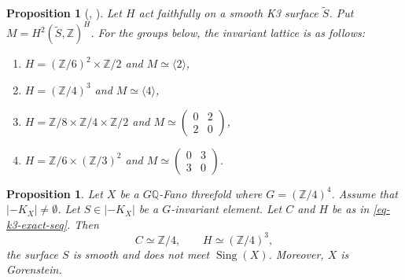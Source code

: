 \documentclass[10pt,oneside,reqno]{amsart}
\numberwithin{equation}{section}
\newtheorem{proposition}[theorem]{Proposition}
\theoremstyle{definition}
\newcommand{\Z}{\mathbb Z}
\newcommand{\Sing}{\operatorname{Sing}}
\begin{document}
\begin{proposition}[{\cite{BH}, \cite[Proposition~4.4]{LPZ}}]
\label{prop-bh-k3}
Let $H$ act faithfully on a smooth K3 surface $\widetilde{S}$.  Put
$M=H^2(\widetilde{S},\Z)^H$.  For the groups below, the invariant lattice is as
follows:
\begin{enumerate}
\item $H=(\Z/6)^2\times\Z/2$ and $M\simeq\langle2\rangle$,
\item $H=(\Z/4)^3$ and $M\simeq\langle4\rangle$,
\item $H=\Z/8\times\Z/4\times\Z/2$ and
$M\simeq\begin{pmatrix}0&2\\2&0\end{pmatrix}$,
\item $H=\Z/6\times(\Z/3)^2$ and
$M\simeq\begin{pmatrix}0&3\\3&0\end{pmatrix}$.
\end{enumerate}
\end{proposition}

\begin{proposition}
\label{prop-k3}
Let $X$ be a $G\mathbb{Q}$-Fano threefold where $G=(\mathbb{Z}/4)^4$.  Assume that $|-K_X|\neq \emptyset$. 
Let $S\in|-K_X|$ be a $G$-invariant element.  Let
$C$ and $H$ be as in \eqref{eq-k3-exact-seq}.  Then
\[
 C\simeq\Z/4,
 \qquad H\simeq(\Z/4)^3,
\]
the surface $S$ is smooth and does not meet $\Sing(X)$.  Moreover, $X$ is
Gorenstein.
\end{proposition}
\end{document}

